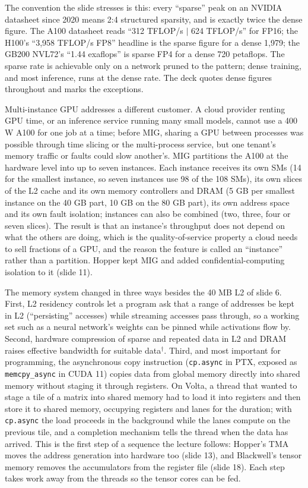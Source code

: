 \documentclass[11pt,letterpaper]{article}
\begin{document}
The convention the slide stresses is this: every ``sparse'' peak on an NVIDIA datasheet since 2020 means 2:4 structured sparsity, and is exactly twice the dense figure. The A100 datasheet reads ``312 TFLOP/s $|$ 624 TFLOP/s'' for FP16; the H100's ``3,958 TFLOP/s FP8'' headline is the sparse figure for a dense 1,979; the GB200 NVL72's ``1.44 exaflops'' is sparse FP4 for a dense 720 petaflops. The sparse rate is achievable only on a network pruned to the pattern; dense training, and most inference, runs at the dense rate. The deck quotes dense figures throughout and marks the exceptions.

Multi-instance GPU addresses a different customer. A cloud provider renting GPU time, or an inference service running many small models, cannot use a 400 W A100 for one job at a time; before MIG, sharing a GPU between processes was possible through time slicing or the multi-process service, but one tenant's memory traffic or faults could slow another's. MIG partitions the A100 at the hardware level into up to seven instances. Each instance receives its own SMs (14 for the smallest instance, so seven instances use 98 of the 108 SMs), its own slices of the L2 cache and its own memory controllers and DRAM (5 GB per smallest instance on the 40 GB part, 10 GB on the 80 GB part), its own address space and its own fault isolation; instances can also be combined (two, three, four or seven slices). The result is that an instance's throughput does not depend on what the others are doing, which is the quality-of-service property a cloud needs to sell fractions of a GPU, and the reason the feature is called an ``instance'' rather than a partition. Hopper kept MIG and added confidential-computing isolation to it (slide 11).

The memory system changed in three ways besides the 40 MB L2 of slide 6. First, L2 residency controls let a program ask that a range of addresses be kept in L2 (``persisting'' accesses) while streaming accesses pass through, so a working set such as a neural network's weights can be pinned while activations flow by. Second, hardware compression of sparse and repeated data in L2 and DRAM raises effective bandwidth for suitable data$^\dagger$. Third, and most important for programming, the asynchronous copy instruction (\texttt{cp.async} in PTX, exposed as \texttt{memcpy\_async} in CUDA 11) copies data from global memory directly into shared memory without staging it through registers. On Volta, a thread that wanted to stage a tile of a matrix into shared memory had to load it into registers and then store it to shared memory, occupying registers and lanes for the duration; with \texttt{cp.async} the load proceeds in the background while the lanes compute on the previous tile, and a completion mechanism tells the thread when the data has arrived. This is the first step of a sequence the lecture follows: Hopper's TMA moves the address generation into hardware too (slide 13), and Blackwell's tensor memory removes the accumulators from the register file (slide 18). Each step takes work away from the threads so the tensor cores can be fed.
\end{document}
